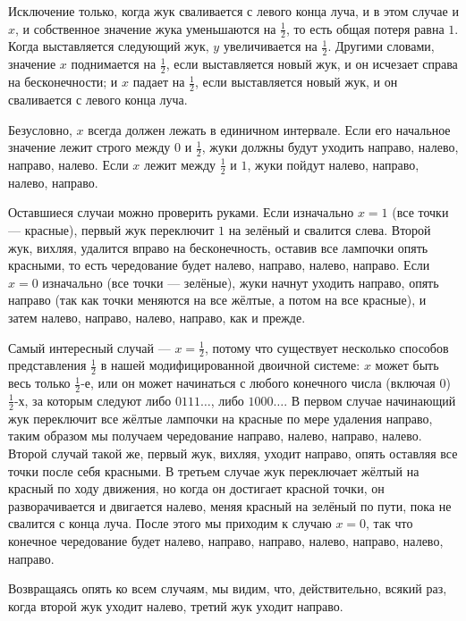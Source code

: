 Исключение только, когда жук сваливается с левого конца луча, и в этом случае и $x$, и собственное значение жука уменьшаются на $\tfrac12$, то есть общая потеря равна $1$.
Когда выставляется следующий жук, $y$ увеличивается на $\tfrac12$.
Другими словами, значение $x$ поднимается на $\tfrac12$, если выставляется новый жук, и он исчезает справа на бесконечности; и $x$ падает на $\tfrac12$, если выставляется новый жук, и он сваливается с левого конца луча.

Безусловно, $x$ всегда должен лежать в единичном интервале.
Если его начальное значение лежит строго между $0$ и $\tfrac12$, жуки должны будут уходить направо, налево, направо, налево.
Если $x$ лежит между $\tfrac12$ и $1$, жуки пойдут налево, направо, налево, направо.

Оставшиеся случаи можно проверить руками.
Если изначально $x = 1$ (все точки --- красные), первый жук переключит $1$ на зелёный и свалится слева.
Второй жук, вихляя, удалится вправо на бесконечность, оставив все лампочки опять красными, то есть чередование будет налево, направо, налево, направо.
Если $x = 0$ изначально (все точки --- зелёные), жуки начнут уходить направо, опять направо (так как точки меняются на все жёлтые, а потом на все красные), и затем налево, направо, налево, направо, как и прежде.

Самый интересный случай --- $x=\tfrac12$, потому что существует несколько способов представления $\tfrac12$ в нашей модифицированной двоичной системе: $x$ может быть весь только $\tfrac12$-е, или он может начинаться с любого конечного числа (включая 0) $\tfrac12$-х, за которым следуют либо $0111\dots$, либо $1000\dots$.
В первом случае начинающий жук переключит все жёлтые лампочки на красные по мере удаления направо, таким образом мы получаем чередование направо, налево, направо, налево.
Второй случай такой же, первый жук, вихляя, уходит направо, опять оставляя все точки после себя красными.
В третьем случае жук переключает жёлтый на красный по ходу движения, но когда он достигает красной точки, он разворачивается и двигается налево, меняя красный на зелёный по пути, пока не свалится с конца луча.
После этого мы приходим к случаю $x = 0$, так что конечное чередование будет налево, направо, направо, налево, направо, налево, направо.

Возвращаясь опять ко всем случаям, мы видим, что, действительно, всякий раз, когда второй жук уходит налево, третий жук уходит направо.
\heart


